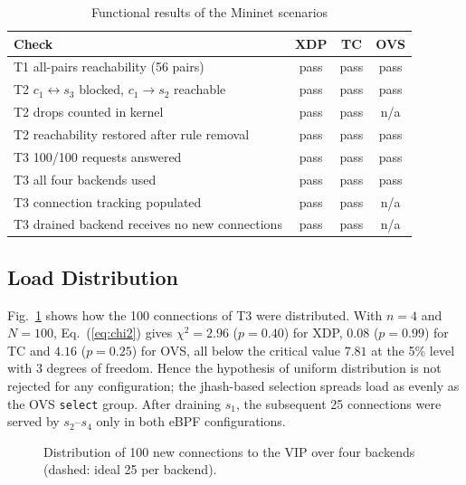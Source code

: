 \documentclass[conference]{IEEEtran}
\begin{document}
\begin{table}[t]
\caption{Functional results of the Mininet scenarios}
\label{tab:correct}
\centering\footnotesize
\begin{tabular}{@{}lccc@{}}
\toprule
Check & XDP & TC & OVS \\
\midrule
T1 all-pairs reachability (56 pairs) & pass & pass & pass \\
T2 $c_1 \leftrightarrow s_3$ blocked, $c_1 \to s_2$ reachable & pass & pass & pass \\
T2 drops counted in kernel & pass & pass & n/a \\
T2 reachability restored after rule removal & pass & pass & pass \\
T3 100/100 requests answered & pass & pass & pass \\
T3 all four backends used & pass & pass & pass \\
T3 connection tracking populated & pass & pass & n/a \\
T3 drained backend receives no new connections & pass & pass & n/a \\
\bottomrule
\end{tabular}
\end{table}

\subsection{Load Distribution}
Fig.~\ref{fig:dist} shows how the 100 connections of T3 were distributed. With
$n=4$ and $N=100$, Eq.~(\ref{eq:chi2}) gives $\chi^2=2.96$ ($p=0.40$) for XDP,
$0.08$ ($p=0.99$) for TC and $4.16$ ($p=0.25$) for OVS, all below the
critical value $7.81$ at the 5\% level with 3 degrees of freedom. Hence the
hypothesis of uniform distribution is not rejected for any configuration; the
jhash-based selection spreads load as evenly as the OVS \texttt{select} group.
After draining $s_1$, the subsequent 25 connections were served by
$s_2$--$s_4$ only in both eBPF configurations.

\begin{figure}[t]
\centering
{}
\caption{Distribution of 100 new connections to the VIP over four backends
(dashed: ideal 25 per backend).}
\label{fig:dist}
\end{figure}
\end{document}
